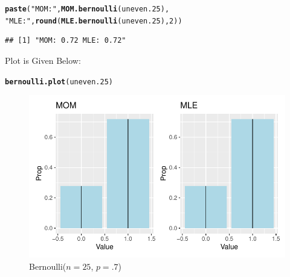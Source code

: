 \documentclass{article}\usepackage[]{graphicx}\usepackage[]{color}
\makeatletter
\def\maxwidth{ %
  \ifdim\Gin@nat@width>\linewidth
    \linewidth
  \else
    \Gin@nat@width
  \fi
}
\newcommand{\hlnum}[1]{\textcolor[rgb]{0.686,0.059,0.569}{#1}}%
\newcommand{\hlstr}[1]{\textcolor[rgb]{0.192,0.494,0.8}{#1}}%
\newcommand{\hlstd}[1]{\textcolor[rgb]{0.345,0.345,0.345}{#1}}%
\newcommand{\hlkwd}[1]{\textcolor[rgb]{0.737,0.353,0.396}{\textbf{#1}}}%
\newenvironment{kframe}{%
 \def\at@end@of@kframe{}%
 \ifinner\ifhmode%
  \def\at@end@of@kframe{\end{minipage}}%
  \begin{minipage}{\columnwidth}%
 \fi\fi%
 \def\FrameCommand##1{\hskip\@totalleftmargin \hskip-\fboxsep
 \colorbox{shadecolor}{##1}\hskip-\fboxsep
     \hskip-\linewidth \hskip-\@totalleftmargin \hskip\columnwidth}%
 \MakeFramed {\advance\hsize-\width
   \@totalleftmargin\z@ \linewidth\hsize
   \@setminipage}}%
 {\par\unskip\endMakeFramed%
 \at@end@of@kframe}
\newenvironment{knitrout}{}{} %
\makeatother
\begin{document}
\begin{enumerate}
\begin{enumerate}
\begin{knitrout}
\begin{kframe}
\begin{alltt}
\hlkwd{paste}\hlstd{(}\hlstr{"MOM:"}\hlstd{,} \hlkwd{MOM.bernoulli}\hlstd{(uneven.25),}
      \hlstr{"MLE:"}\hlstd{,} \hlkwd{round}\hlstd{(}\hlkwd{MLE.bernoulli}\hlstd{(uneven.25),}\hlnum{2}\hlstd{))}
\end{alltt}
\begin{verbatim}
## [1] "MOM: 0.72 MLE: 0.72"
\end{verbatim}
\end{kframe}
\end{knitrout}
Plot is Given Below:
\begin{knitrout}
\color{fgcolor}\begin{kframe}
\begin{alltt}
\hlkwd{bernoulli.plot}\hlstd{(uneven.25)}
\end{alltt}
\end{kframe}
\end{knitrout}
\begin{figure}[H]
  \begin{center}
\begin{knitrout}
\color{fgcolor}
\includegraphics[width=\maxwidth]{figure/unnamed-chunk-55-1} 
\end{knitrout}
    \caption{Bernoulli($n=25$, $p=.7$)}
    \label{p4plot4}%
  \end{center}
\end{figure}

\end{enumerate}
\end{enumerate}
\end{document}
